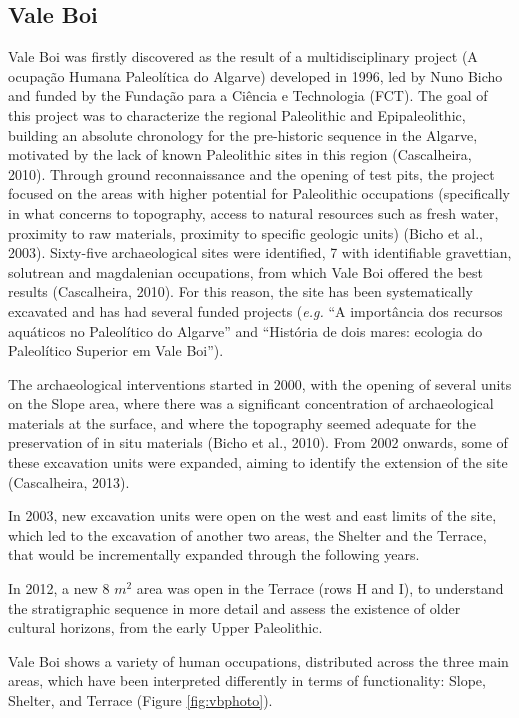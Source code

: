 \documentclass[12pt,twoside]{reedthesis}
\begin{document}
\hypertarget{vale-boi-1}{%
\subsection{Vale Boi}\label{vale-boi-1}}

Vale Boi was firstly discovered as the result of a multidisciplinary project (A ocupação Humana Paleolítica do Algarve) developed in 1996, led by Nuno Bicho and funded by the Fundação para a Ciência e Technologia (FCT). The goal of this project was to characterize the regional Paleolithic and Epipaleolithic, building an absolute chronology for the pre-historic sequence in the Algarve, motivated by the lack of known Paleolithic sites in this region (Cascalheira, 2010). Through ground reconnaissance and the opening of test pits, the project focused on the areas with higher potential for Paleolithic occupations (specifically in what concerns to topography, access to natural resources such as fresh water, proximity to raw materials, proximity to specific geologic units) (Bicho et al., 2003). Sixty-five archaeological sites were identified, 7 with identifiable gravettian, solutrean and magdalenian occupations, from which Vale Boi offered the best results (Cascalheira, 2010). For this reason, the site has been systematically excavated and has had several funded projects (\emph{e.g.} ``A importância dos recursos aquáticos no Paleolítico do Algarve'' and ``História de dois mares: ecologia do Paleolítico Superior em Vale Boi'').

The archaeological interventions started in 2000, with the opening of several units on the Slope area, where there was a significant concentration of archaeological materials at the surface, and where the topography seemed adequate for the preservation of in situ materials (Bicho et al., 2010). From 2002 onwards, some of these excavation units were expanded, aiming to identify the extension of the site (Cascalheira, 2013).

In 2003, new excavation units were open on the west and east limits of the site, which led to the excavation of another two areas, the Shelter and the Terrace, that would be incrementally expanded through the following years.

In 2012, a new 8 \(m^2\) area was open in the Terrace (rows H and I), to understand the stratigraphic sequence in more detail and assess the existence of older cultural horizons, from the early Upper Paleolithic.

Vale Boi shows a variety of human occupations, distributed across the three main areas, which have been interpreted differently in terms of functionality: Slope, Shelter, and Terrace (Figure \ref{fig:vbphoto}).
\end{document}
